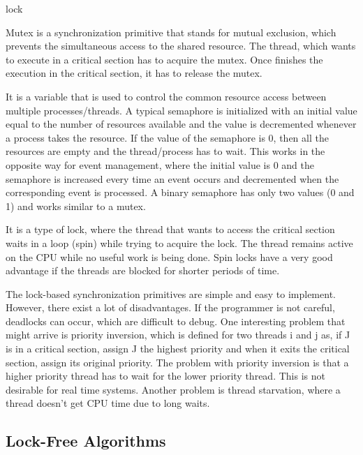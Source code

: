 \begin{labeling}{lock}
\item[Mutex] Mutex is a synchronization primitive that stands for mutual exclusion, which prevents the simultaneous access to the shared resource. The thread, which wants to execute in a critical section has to acquire the mutex. Once finishes the execution in the critical section, it has to release the mutex. 

\item[Semaphore] It is a variable that is used to control the common resource access between multiple processes/threads. A typical semaphore is initialized with an initial value equal to the number of resources  available and the value is decremented whenever a process takes the resource. If the value of the semaphore is 0, then all the resources are empty and the thread/process has to wait. This works in the opposite way for event management, where the initial value is 0 and the semaphore is increased every time an event occurs and decremented when the corresponding event is processed. A binary semaphore has only two values (0 and 1) and works similar to a mutex.   

\item[Spin-lock] It is a type of lock, where the thread that wants to access the critical section waits in a loop (spin) while trying to acquire the lock. The thread remains active on the CPU while no useful work is being done. Spin locks have a very good advantage if the threads are blocked for shorter periods of time.
\end{labeling} 

The lock-based synchronization primitives are simple and easy to implement. However, there exist a lot of disadvantages. If the programmer is not careful, deadlocks can occur, which are difficult to debug. One interesting problem that might arrive is priority inversion, which is defined for two threads i and j as, if J is in a critical section, assign J the highest priority and when it exits the critical section, assign its original priority. The problem with priority inversion is that a higher priority thread has to wait for the lower priority thread. This is not desirable for real time systems. Another problem is thread starvation, where a thread doesn't get CPU time due to long waits.
 
\subsection{Lock-Free Algorithms}

